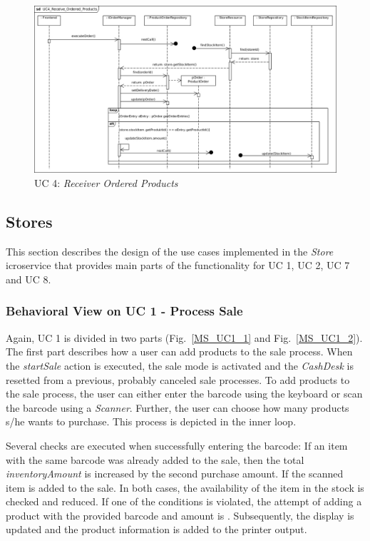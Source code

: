 			\begin{figure}[!h]
				\centering
				\includegraphics[width = 1\textwidth]{img/UC4_Receive_Ordered_Products.jpg}
				\caption{UC 4: \textit{Receiver Ordered Products} }
				\label{MS_UC4}
			\end{figure}
			
		\FloatBarrier
			
		\subsection{Stores}
			This section describes the design of the use cases implemented in the \textit{Store} icroservice that provides main parts of the functionality for UC 1, UC 2, UC 7 and UC 8.

		\subsubsection*{Behavioral View on UC 1 - Process Sale} 
		Again, UC 1 is divided in two parts (Fig.~\ref{MS_UC1_1} and Fig.~\ref{MS_UC1_2}).
		The first part describes how a user can add products to the sale process. When the \textit{startSale} action is executed, the sale mode is activated and the \textit{CashDesk} is resetted from a previous, probably canceled sale processes. To add products to the sale process, the user can either enter the barcode  using the keyboard or scan the barcode using a \textit{Scanner}. Further, the user can choose how many products s/he wants to purchase. This process is depicted in the inner loop. 
		
		Several checks are executed when successfully entering the barcode: 
		If an item with the same barcode was already added to the sale, then the total \textit{inventoryAmount} is increased by the second purchase amount. 
		If the scanned item is added to the sale.
		In both cases, the availability of the item in the stock is checked and reduced. 
		If one of the conditions is violated, the attempt of adding a product with the provided barcode and amount is . 
		Subsequently, the display is updated and the product information is added to the printer output.
		
